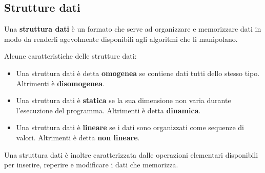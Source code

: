 \subsection{Strutture dati}
\begin{definition}
Una \textbf{struttura dati} è un formato che serve ad organizzare e memorizzare dati in modo da renderli agevolmente disponibili agli algoritmi che li manipolano.
\end{definition}
\hspace{-15pt}Alcune caratteristiche delle strutture dati:
\begin{itemize}
    \item Una struttura dati è detta \textbf{omogenea} se contiene dati tutti dello stesso tipo. Altrimenti è \textbf{disomogenea}.
    \item Una struttura dati è \textbf{statica} se la sua dimensione non varia durante l'esecuzione del programma. Altrimenti è detta \textbf{dinamica}.
    \item Una struttura dati è \textbf{lineare} se i dati sono organizzati come sequenze di valori. Altrimenti è detta \textbf{non lineare}.
\end{itemize}
Una struttura dati è inoltre caratterizzata dalle operazioni elementari disponibili per inserire, reperire e modificare i dati che memorizza.
